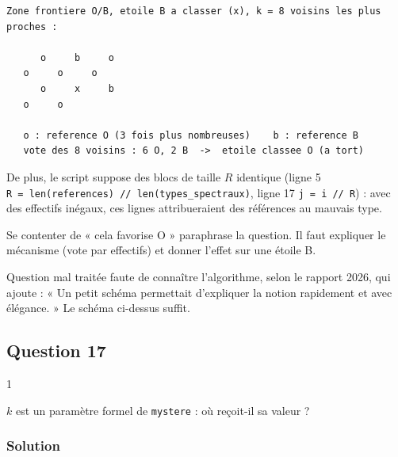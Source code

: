 \documentclass[11pt,a4paper]{article}
\newcommand{\equationajustee}[1]{%
  \sbox{\boiteequation}{$\displaystyle #1$}%
  \ifdim\wd\boiteequation>\linewidth
    \[\resizebox{\linewidth}{!}{\usebox{\boiteequation}}\]%
  \else
    \[#1\]%
  \fi}
\begin{document}
\begin{lstlisting}
Zone frontiere O/B, etoile B a classer (x), k = 8 voisins les plus proches :

      o     b     o
   o     o     o
      o     x     b
   o     o

   o : reference O (3 fois plus nombreuses)    b : reference B
   vote des 8 voisins : 6 O, 2 B  ->  etoile classee O (a tort)
\end{lstlisting}

De plus, le script suppose des blocs de taille \(R\) identique (ligne 5 \texttt{R\ =\allowbreak{}\ len(\allowbreak{}references)\allowbreak{}\ /\allowbreak{}/\allowbreak{}\ len(\allowbreak{}types\_spectraux)\allowbreak{}}, ligne 17 \texttt{j\ =\ i\ //\ R}) : avec des effectifs inégaux, ces lignes attribueraient des références au mauvais type.

\begin{piege}

Se contenter de « cela favorise O » paraphrase la question. Il faut expliquer le mécanisme (vote par effectifs) et donner l'effet sur une étoile B.

\end{piege}

\begin{jury}

Question mal traitée faute de connaître l'algorithme, selon le rapport 2026, qui ajoute : « Un petit schéma permettait d'expliquer la notion rapidement et avec élégance. » Le schéma ci-dessus suffit.

\end{jury}

\hypertarget{question-17}{%
\subsection{Question 17}\label{question-17}}

\begin{indication}{1}

\(k\) est un paramètre formel de \texttt{mystere} : où reçoit-il sa valeur ?

\end{indication}

\hypertarget{solution-16}{%
\subsubsection{Solution}\label{solution-16}}

\equationajustee{\boxed{k = 8}}
\end{document}
